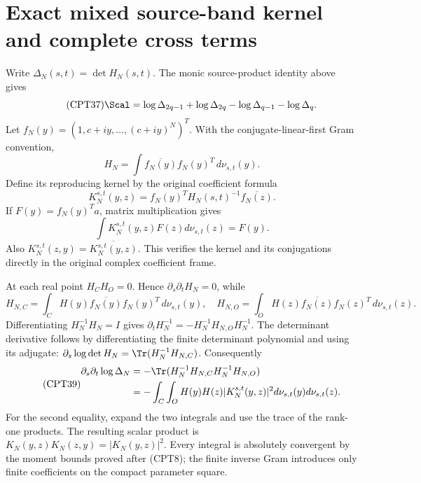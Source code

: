 \section{Exact mixed source-band kernel and complete cross terms}

Write \(\Delta_N(s,t)=\det H_N(s,t)\).
The monic source-product identity above gives
\begin{equation}\tag{CPT37}
 \Scal=
 \log\Delta_{2q-1}+\log\Delta_{2q}
          -\log\Delta_{q-1}-\log\Delta_q.
\end{equation}
Let \(f_N(y)=(1,c+iy,\ldots,(c+iy)^N)^T\).
With the conjugate-linear-first Gram convention,
\[
 H_N=\int\overline{f_N(y)}f_N(y)^T\,d\nu_{s,t}(y).
\]
Define its reproducing kernel by the original coefficient formula
\begin{equation}\tag{CPT38}
 K_N^{s,t}(y,z)
   =f_N(y)^T H_N(s,t)^{-1}\overline{f_N(z)}.
\end{equation}
If \(F(y)=f_N(y)^Ta\), matrix multiplication gives
\[
 \int K_N^{s,t}(y,z)F(z)d\nu_{s,t}(z)=F(y).
\]
Also \(K_N^{s,t}(z,y)=\overline{K_N^{s,t}(y,z)}\).
This verifies the kernel and its conjugations directly in the
original complex coefficient frame.

At each real point \(H_CH_O=0\).  Hence
\(\partial_s\partial_tH_N=0\), while
\[
 H_{N,C}=\int_C H(y)\overline{f_N(y)}f_N(y)^T\,d\nu_{s,t}(y),
 \quad
 H_{N,O}=\int_O H(z)\overline{f_N(z)}f_N(z)^T\,d\nu_{s,t}(z).
\]
Differentiating \(H_N^{-1}H_N=I\) gives
\(\partial_tH_N^{-1}=-H_N^{-1}H_{N,O}H_N^{-1}\).
The determinant derivative follows by differentiating the
finite determinant polynomial and using its adjugate:
\(\partial_s\log\det H_N=\Tr(H_N^{-1}H_{N,C})\).
Consequently
\begin{equation}\tag{CPT39}
\begin{split}
 \partial_s\partial_t\log\Delta_N
 &=-\Tr(H_N^{-1}H_{N,C}H_N^{-1}H_{N,O})\\
 &=-\int_C\int_O H(y)H(z)|K_N^{s,t}(y,z)|^2
                          d\nu_{s,t}(y)d\nu_{s,t}(z).
\end{split}
\end{equation}
For the second equality, expand the two integrals and use the
trace of the rank-one products.  The resulting scalar product
is \(K_N(y,z)K_N(z,y)=|K_N(y,z)|^2\).
Every integral is absolutely convergent by the moment bounds
proved after (CPT8); the finite inverse Gram introduces only
finite coefficients on the compact parameter square.

